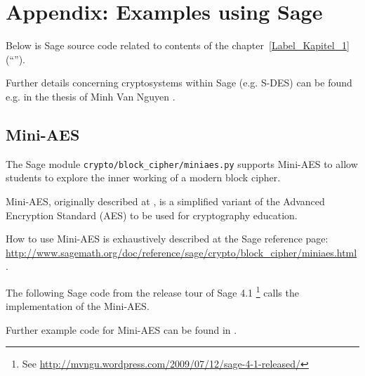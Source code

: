	

\newpage
\hypertarget{CM_Appendix_SageCode}{}
\section{Appendix: Examples using Sage}
\label{CM_Sage_samples}

\noindent Below is Sage source code related to contents of the
chapter~\ref{Label_Kapitel_1} (``''). 

Further details concerning cryptosystems within Sage (e.g. S-DES) can be
found e.g. in the thesis of Minh Van Nguyen \cite{cm:Nguyen2009}.

\subsection{Mini-AES}
\label{CM_Sage_Mini-AES}

The Sage module \texttt{crypto/block\_cipher/miniaes.py} supports Mini-AES to allow
students to explore the inner working of a modern block cipher.

Mini-AES, originally described at \cite{cm:Phan2002}, is a simplified variant of the
Advanced Encryption Standard (AES) to be used for cryptography education.

How to use Mini-AES is exhaustively described at the Sage reference page:\\
\url{http://www.sagemath.org/doc/reference/sage/crypto/block_cipher/miniaes.html}.

The following Sage code from the release tour of Sage 4.1%
\footnote{
See \url{http://mvngu.wordpress.com/2009/07/12/sage-4-1-released/}
}
calls the implementation of the Mini-AES.

Further example code for Mini-AES can be found in \cite[chap. 6.5 and appendix D]{cm:Nguyen2009}.


